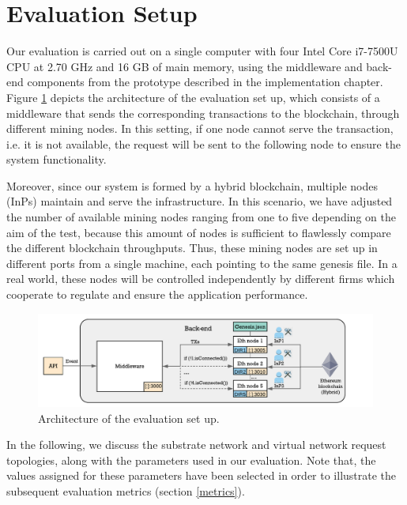 \section{Evaluation Setup}

Our evaluation is carried out on a single computer with four Intel Core i7-7500U CPU at 2.70 GHz and 16 GB of main memory, using the middleware and back-end components from the prototype described in the implementation chapter. Figure \ref{fig:ev_scenario} depicts the architecture of the evaluation set up, which consists of a middleware that sends the corresponding transactions to the blockchain, through different mining nodes. In this setting, if one node cannot serve the transaction, i.e. it is not available, the request will be sent to the following node to ensure the system functionality.

Moreover, since our system is formed by a hybrid blockchain, multiple nodes (InPs) maintain and serve the infrastructure. In this scenario, we have adjusted the number of available mining nodes ranging from one to five depending on the aim of the test, because this amount of nodes is sufficient to flawlessly compare the different blockchain throughputs. Thus, these mining nodes are set up in different ports from a single machine, each pointing to the same genesis file. In a real world, these nodes will be controlled independently by different firms which cooperate to regulate and ensure the application performance.

\begin{figure}[bth]
	\centering
	\includegraphics[width=1\linewidth]{gfx/Evaluation_scenario}    
  	\caption{Architecture of the evaluation set up.}
  	\label{fig:ev_scenario}
\end{figure}

In the following, we discuss the substrate network and virtual network request topologies, along with the parameters used in our evaluation. Note that, the values assigned for these parameters have been selected in order to illustrate the subsequent evaluation metrics (section \ref{metrics}).

